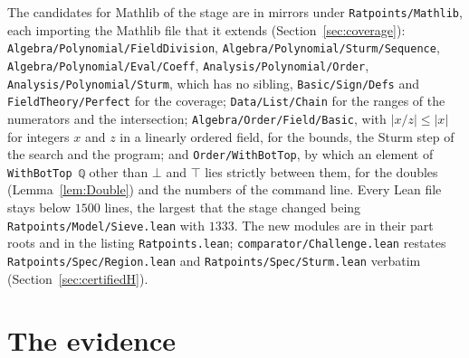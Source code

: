 The candidates for Mathlib of the stage are in mirrors under \verb|Ratpoints/Mathlib|, each
importing the Mathlib file that it extends (Section~\ref{sec:coverage}):
\verb|Algebra/Polynomial/FieldDivision|, \verb|Algebra/Polynomial/Sturm/Sequence|,
\verb|Algebra/Polynomial/Eval/Coeff|, \verb|Analysis/Polynomial/Order|,
\verb|Analysis/Polynomial/Sturm|, which has no sibling, \verb|Basic/Sign/Defs| and
\verb|FieldTheory/Perfect| for the coverage; \verb|Data/List/Chain| for the ranges of the numerators
and the intersection; \verb|Algebra/Order/Field/Basic|, with $|x/z| \le |x|$ for integers $x$ and
$z$ in a linearly ordered field, for the bounds, the Sturm step of the search and the program; and
\verb|Order/WithBotTop|, by which an element of \verb|WithBotTop ℚ| other than $\bot$ and $\top$
lies strictly between them, for the doubles (Lemma~\ref{lem:Double}) and the numbers of the command
line. Every Lean file stays below $1500$ lines, the largest that the stage changed being
\verb|Ratpoints/Model/Sieve.lean| with $1333$. The new modules are in their part roots and in the
listing \verb|Ratpoints.lean|; \verb|comparator/Challenge.lean| restates
\verb|Ratpoints/Spec/Region.lean| and \verb|Ratpoints/Spec/Sturm.lean| verbatim
(Section~\ref{sec:certifiedH}).

\section{The evidence}\label{sec:region-evidence}

